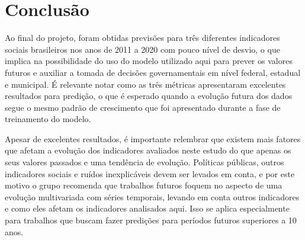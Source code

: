 \section{Conclusão}

Ao final do projeto, foram obtidas previsões para três diferentes indicadores 
sociais brasileiros nos anos de 2011 a 2020 com pouco nível de desvio, o que 
implica na possibilidade do uso do modelo utilizado aqui para prever os valores 
futuros e auxiliar a tomada de decisões governamentais em nível federal, 
estadual e municipal. É relevante notar como as três métricas apresentaram 
excelentes resultados para predição, o que é esperado quando a evolução futura 
dos dados segue o mesmo padrão de crescimento que foi apresentado durante a 
fase de treinamento do modelo.

Apesar de excelentes resultados, é importante relembrar que existem mais fatores 
que afetam a evolução dos indicadores avaliados neste estudo do que apenas os 
seus valores passados e uma tendência de evolução. Políticas públicas, outros 
indicadores sociais e ruídos inexplicáveis devem ser levados em conta, e por este 
motivo o grupo recomenda que trabalhos futuros foquem no aspecto de uma evolução 
multivariada com séries temporais, levando em conta outros indicadores e como eles 
afetam os indicadores analisados aqui. Isso se aplica especialmente para trabalhos 
que buscam fazer predições para períodos futuros superiores a 10 anos.
